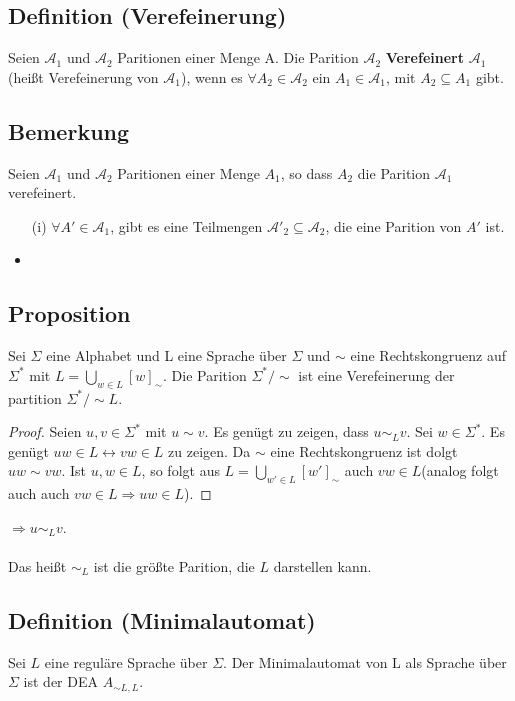 \documentclass[a4paper,11pt]{article}
\begin{document}
\subsection{Definition (Verefeinerung)} Seien $\mathcal{A}_1$ und $\mathcal{A}_2$ Paritionen einer Menge A. Die Parition $\mathcal{A}_2$ \textbf{Verefeinert} $\mathcal{A}_1$ (heißt Verefeinerung von $\mathcal{A}_1$), wenn es $\forall A_2 \in \mathcal{A}_2$ ein $A_1 \in \mathcal{A}_1$, mit $A_2 \subseteq A_1$ gibt.

\subsection{Bemerkung} Seien $\mathcal{A}_1$ und $\mathcal{A}_2$ Paritionen einer Menge $A_1$, so dass $A_2$ die Parition $\mathcal{A}_1$ verefeinert.
\begin{itemize}
  \item [(i)] $\forall A' \in \mathcal{A}_1$, gibt es eine Teilmengen $\mathcal{A}'_2 \subseteq \mathcal{A}_2$, die eine Parition von $A'$ ist.
  \item 
\end{itemize}

\subsection{Proposition} Sei $\Sigma$ eine Alphabet und L eine Sprache über $\Sigma$ und $\sim$ eine Rechtskongruenz auf $\Sigma^*$ mit $L = \bigcup \limits_{w \in L} [w]_{\sim}$. Die Parition $\Sigma^*/\sim$ ist eine Verefeinerung der partition $\Sigma^*/ \sim L$.

\begin{proof}
  Seien $u, v \in \Sigma^*$ mit $u \sim v$. Es genügt zu zeigen, dass $u \sim_{L} v$. Sei $w \in \Sigma^*$. Es genügt $uw \in L \leftrightarrow vw \in L$ zu zeigen. Da $\sim$ eine Rechtskongruenz ist dolgt $uw \sim vw$. Ist $u, w \in L$, so folgt aus $L = \bigcup \limits_{w' \in L} [w']_\sim$ auch $vw \in L$(analog folgt auch auch $vw \in L \Rightarrow uw \in L$).
\end{proof}

$\Rightarrow u \sim_L v$.\\\\

Das heißt $\sim_L$ ist die größte Parition, die $L$ darstellen kann.

\subsection{Definition (Minimalautomat)} Sei $L$ eine reguläre Sprache über $\Sigma$. Der Minimalautomat von L als Sprache über $\Sigma$ ist der DEA $A_{\sim L, L}$.
\end{document}
